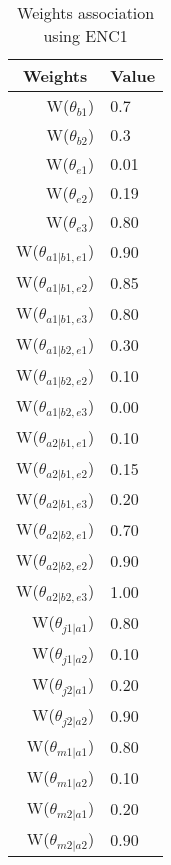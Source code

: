 \begin{table}[H]
\centering
\caption{Weights association using ENC1}
\label{weightsEnc1}
\begin{tabular}{rl}
\hline
\multicolumn{1}{c}{Weights} & \multicolumn{1}{c}{Value} \\ \hline
W(\(\theta_{b1}\)) & 0.7 \\ 
W(\(\theta_{b2}\)) & 0.3 \\ 
W(\(\theta_{e1}\)) & 0.01 \\ 
W(\(\theta_{e2}\)) & 0.19 \\ 
W(\(\theta_{e3}\)) & 0.80 \\ 
W(\(\theta_{a1|b1,e1}\)) & 0.90 \\
W(\(\theta_{a1|b1,e2}\)) & 0.85 \\
W(\(\theta_{a1|b1,e3}\)) & 0.80 \\
W(\(\theta_{a1|b2,e1}\)) & 0.30 \\
W(\(\theta_{a1|b2,e2}\)) & 0.10 \\
W(\(\theta_{a1|b2,e3}\)) & 0.00 \\
W(\(\theta_{a2|b1,e1}\)) & 0.10 \\
W(\(\theta_{a2|b1,e2}\)) & 0.15 \\
W(\(\theta_{a2|b1,e3}\)) & 0.20 \\
W(\(\theta_{a2|b2,e1}\)) & 0.70 \\
W(\(\theta_{a2|b2,e2}\)) & 0.90 \\
W(\(\theta_{a2|b2,e3}\)) & 1.00 \\
W(\(\theta_{j1|a1}\)) & 0.80 \\
W(\(\theta_{j1|a2}\)) & 0.10 \\
W(\(\theta_{j2|a1}\)) & 0.20 \\
W(\(\theta_{j2|a2}\)) & 0.90 \\
W(\(\theta_{m1|a1}\)) & 0.80 \\
W(\(\theta_{m1|a2}\)) & 0.10 \\
W(\(\theta_{m2|a1}\)) & 0.20 \\
W(\(\theta_{m2|a2}\)) & 0.90
\end{tabular}
\end{table}
